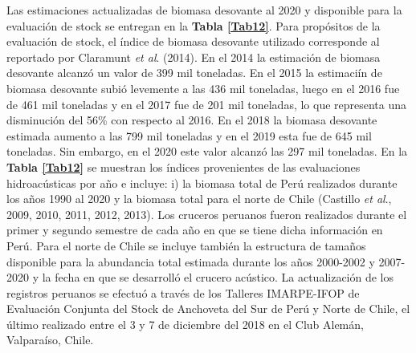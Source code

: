 \documentclass[letter,11pt]{article}
\begin{document}
\quad

Las estimaciones actualizadas de biomasa desovante al 2020 y disponible
para la evaluaci\'on de stock se entregan en la
\textbf{Tabla \ref{Tab12}}. Para prop\'ositos de la evaluaci\'on de stock,
el \'indice de biomasa desovante utilizado corresponde al reportado por
Claramunt \textit{et al}. (2014). En el 2014 la estimaci\'on de biomasa
desovante alcanz\'o un valor de 399 mil toneladas. En el 2015 la
estimaci\'in de biomasa desovante subi\'o levemente a las 436 mil toneladas,
luego en el 2016 fue de 461 mil toneladas y en el 2017 fue de 201 mil
toneladas, lo que representa una disminuci\'on del 56\% con respecto al
2016. En el 2018 la biomasa desovante estimada aumento a las 799 mil
toneladas y en el 2019 esta fue de 645 mil toneladas. Sin embargo, en el
2020 este valor alcanz\'o las 297 mil toneladas. En la
\textbf{Tabla \ref{Tab12}} se muestran los \'indices provenientes de las
evaluaciones hidroac\'usticas por a\~{n}o e incluye: i) la biomasa total de
Per\'u realizados durante los a\~{n}os 1990 al 2020 y la biomasa total para el
norte de Chile (Castillo \textit{et al}., 2009, 2010, 2011, 2012, 2013).
Los cruceros peruanos fueron realizados durante el primer y segundo
semestre de cada a\~{n}o en que se tiene dicha informaci\'on en Per\'u. Para el
norte de Chile se incluye tambi\'en la estructura de tama\~{n}os disponible
para la abundancia total estimada durante los a\~{n}os 2000-2002 y 2007-2020
y la fecha en que se desarroll\'o el crucero ac\'ustico. La actualizaci\'on de
los registros peruanos se efectu\'o a trav\'es de los Talleres IMARPE-IFOP
de Evaluaci\'on Conjunta del Stock de Anchoveta del Sur de Per\'u y Norte de
Chile, el \'ultimo realizado entre el 3 y 7 de diciembre del 2018 en el
Club Alem\'an, Valpara\'iso, Chile.
\end{document}
